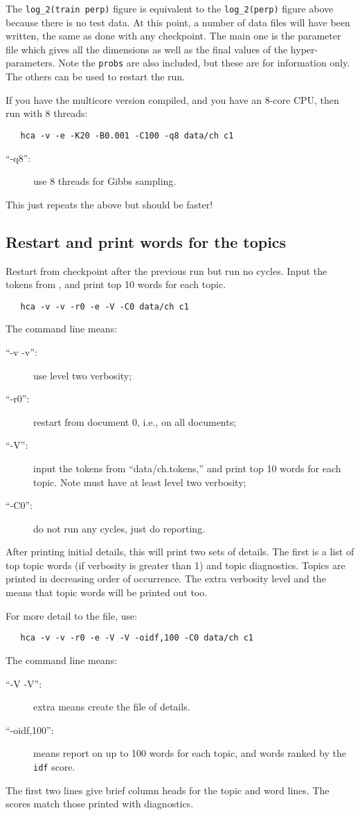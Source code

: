\documentclass[a4paper,english]{article}
\begin{document}
The \texttt{log\_2(train perp)} figure is equivalent
to the \texttt{log\_2(perp)} figure 
above because there is no test data.
At this point, a number of data files will have been
written, the same as done with any checkpoint.
The main one is the parameter file
 which gives all the dimensions as well
as the final values of the hyper-parameters.
Note the \texttt{probs} are also included, but these
are for information only.
The others can be used to restart the run.

If you have the multicore version compiled, 
and you have an 8-core CPU, then run with 8 threads:
\begin{verbatim}
   hca -v -e -K20 -B0.001 -C100 -q8 data/ch c1
\end{verbatim}
\begin{description}
\item[``-q8'':] use 8 threads for Gibbs sampling.
\end{description}
This just repeats the above but should be faster!

\subsection{Restart and print words for the topics}
Restart from checkpoint after the previous run but run no cycles.
Input the tokens from
, and print top 10 words for each topic.
\begin{verbatim}
   hca -v -v -r0 -e -V -C0 data/ch c1
\end{verbatim}
The command line means:
\begin{description}
\item[``-v -v'':] use level two verbosity;
\item[``-r0'':] restart from document 0, i.e., on all documents;
\item[``-V'':] input the tokens from
``data/ch.tokens,'' and print top 10 words for each topic.
Note must have at least level two verbosity;
\item[``-C0'':] do not run any cycles, just do reporting.
\end{description}
After printing initial details, this will print two
sets of details.
The first is a list of top topic words (if verbosity is greater than 1)
and topic diagnostics. 
Topics are printed in decreasing order of occurrence.
The extra verbosity level and the 
means that topic words will be printed out too.

For more detail to the  file, use:
\begin{verbatim}
   hca -v -v -r0 -e -V -V -oidf,100 -C0 data/ch c1
\end{verbatim}
The command line means:
\begin{description}
\item[``-V -V'':] extra  means create the 
 file of details.
\item[``-oidf,100'':] means report on up to 100 words for each topic,
and words ranked by the \texttt{idf} score.
\end{description}
The first two lines give brief column heads for the topic and word lines.
The scores match those printed with diagnostics.
\end{document}
